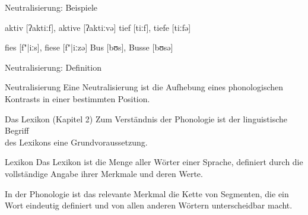 \begin{frame}
  {Neutralisierung: Beispiele}
  \pause
  \begin{exe}
    \ex
    \begin{xlist}
      \pause
      \pause
    \end{xlist}
    \ex
    \begin{xlist}
      \pause
      \pause
    \end{xlist}
    \ex
    \begin{xlist}
      \pause
      \pause
    \end{xlist}
    \ex
    \begin{xlist}
      \ex aktiv [ʔaktiːf], aktive [ʔaktiːvə]
      \pause
      \ex tief [tiːf], tiefe [tiːfə]
      \pause
    \end{xlist}
    \ex
    \begin{xlist}
      \ex fies [f"|iːs], fiese [f"|iːzə]
      \pause
      \ex Bus [bʊs], Busse [bʊsə]
      \pause
    \end{xlist}
  \end{exe}
\end{frame}

\begin{frame}
  {Neutralisierung: Definition}
  \pause
  \Large
  \begin{block}{Neutralisierung}
    Eine Neutralisierung ist die Aufhebung eines phonologischen Kontrasts in einer bestimmten Position.    
  \end{block}
\end{frame}

\begin{frame}
  {Das Lexikon (Kapitel 2)}
  \pause
  \large Zum Verständnis der Phonologie ist der linguistische Begriff\\
  des Lexikons eine Grundvoraussetzung.\\
  \Large
  \Zeile
  \pause
  \begin{block}{Lexikon}
    Das \alert{Lexikon} ist die Menge aller Wörter einer Sprache, definiert durch die vollständige Angabe ihrer Merkmale und deren Werte.    
  \end{block}
  \pause
  \Zeile
  \large
  In der Phonologie ist das relevante Merkmal die \alert{Kette von Segmenten}, die ein Wort eindeutig definiert und von allen anderen Wörtern unterscheidbar macht.
\end{frame}

